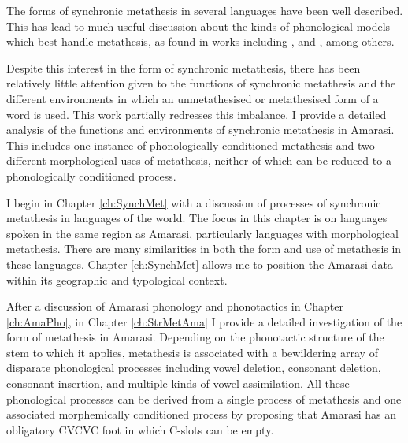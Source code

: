 \begin{exe}
	\label{ex:el. 22/02/16 p.19}
\end{exe}

The forms of synchronic metathesis in several languages have been well described.
This has lead to much useful discussion about the kinds
of phonological models which best handle metathesis,
as found in works including
\cite{be87,huen95,hu98,huse04,hu04}, and \cite{he04}, among others.

Despite this interest in the form of synchronic metathesis,
there has been relatively little attention given to
the functions of synchronic metathesis
and the different environments in which an unmetathesised
or metathesised form of a word is used.
This work partially redresses this imbalance.
I provide a detailed analysis of the functions and
environments of synchronic metathesis in Amarasi.
This includes one instance of phonologically conditioned metathesis
and two different morphological uses of metathesis,
neither of which can be reduced to a phonologically conditioned process.

I begin in Chapter \ref{ch:SynchMet} with a discussion
of processes of synchronic metathesis in languages of the world.
The focus in this chapter is on languages spoken in the same region
as Amarasi, particularly languages with morphological metathesis.
There are many similarities in both the form and use of metathesis in these languages.
Chapter \ref{ch:SynchMet} allows me to position the Amarasi
data within its geographic and typological context.

After a discussion of Amarasi phonology and phonotactics
in Chapter \ref{ch:AmaPho}, in Chapter \ref{ch:StrMetAma}
I provide a detailed investigation of the form of metathesis in Amarasi.
Depending on the phonotactic structure of the stem to which it applies,
metathesis is associated with a bewildering
array of disparate phonological processes including
vowel deletion, consonant deletion, consonant insertion,
and multiple kinds of vowel assimilation.
All these phonological processes
can be derived from a single process of metathesis and
one associated morphemically conditioned process
by proposing that Amarasi has an obligatory
CVCVC foot in which C-slots can be empty.

